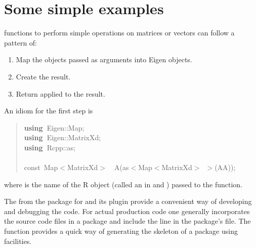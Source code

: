 \documentclass[shortnames,article]{jss}
\newcommand{\hlstd}[1]{\textcolor[rgb]{0,0,0}{#1}}
\newcommand{\hlsym}[1]{\textcolor[rgb]{0,0,0}{#1}}
\newcommand{\hlkwa}[1]{\textcolor[rgb]{0.61,0.13,0.93}{\bf{#1}}}
\newcommand{\hlkwb}[1]{\textcolor[rgb]{0.13,0.54,0.13}{#1}}
\newcommand{\hlkwd}[1]{\textcolor[rgb]{0,0,0}{#1}}
\begin{document}
\pagebreak
\section{Some simple examples}
\label{sec:simple}

 functions to perform simple operations on matrices or
vectors can follow a pattern of:
\begin{enumerate}
\item Map the  objects passed as arguments into Eigen objects.
\item Create the result.
\item Return  applied to the result.
\end{enumerate}

An idiom for the first step is

\begin{quote}
  \noindent
  \ttfamily
  \hlstd{}\hlkwa{using\ }\hlstd{Eigen}\hlsym{::}\hlstd{Map}\hlsym{;}\hspace*{\fill}\\
  \hlstd{}\hlkwa{using\ }\hlstd{Eigen}\hlsym{::}\hlstd{MatrixXd}\hlsym{;}\hspace*{\fill}\\
  \hlstd{}\hlkwa{using\ }\hlstd{Rcpp}\hlsym{::}\hlstd{as}\hlsym{;}\hspace*{\fill}\\
  \hlstd{}\hspace*{\fill}\\
  \hlkwb{const\ }\hlstd{Map}\hlsym{$<$}\hlstd{MatrixXd}\hlsym{$>$}\hlstd{\ \ }\hlsym{}\hlstd{}\hlkwd{A}\hlstd{}\hlsym{(}\hlstd{as}\hlsym{$<$}\hlstd{Map}\hlsym{$<$}\hlstd{MatrixXd}\hlsym{$>$\ $>$(}\hlstd{AA}\hlsym{));}\hlstd{}\hspace*{\fill}\\
  \mbox{}
  \normalfont
\end{quote}
where  is the name of the R object (called an  in
 and ) passed to the  function.

The  from the  package \citep*{CRAN:inline} for
 and its  plugin provide a convenient way of
developing and debugging the  code.  For actual production code
one generally incorporates the  source code files in a package
and include the line  in the package's
 file.  The  function
provides a quick way of generating the skeleton of a package using
 facilities.
\end{document}
